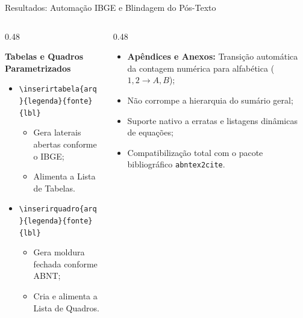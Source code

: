 \documentclass[aspectratio=169, 10pt]{beamer}
\begin{document}
\begin{frame}{Resultados: Automação IBGE e Blindagem do Pós-Texto}
  \begin{columns}[T]
    \begin{column}{0.48\textwidth}
      \begin{block}{\textbf{Tabelas e Quadros Parametrizados}}
        \begin{itemize}
          \item \texttt{\textbackslash inserirtabela\{arq\}\{legenda\}\{fonte\}\{lbl\}}
            \begin{itemize}
              \item Gera laterais abertas conforme o IBGE;
              \item Alimenta a Lista de Tabelas.
            \end{itemize}
          \item \texttt{\textbackslash inserirquadro\{arq\}\{legenda\}\{fonte\}\{lbl\}}
            \begin{itemize}
              \item Gera moldura fechada conforme ABNT;
              \item Cria e alimenta a Lista de Quadros.
            \end{itemize}
        \end{itemize}
      \end{block}
    \end{column}

    \begin{column}{0.48\textwidth}
      \begin{tcolorbox}[colback=white,colframe=conepeteal,title=\textbf{Robustez Pós-Textual}]
        \begin{itemize}
          \item \textbf{Apêndices e Anexos:} Transição automática da contagem numérica para alfabética ($1, 2 \to A, B$);
          \item Não corrompe a hierarquia do sumário geral;
          \item Suporte nativo a erratas e listagens dinâmicas de equações;
          \item Compatibilização total com o pacote bibliográfico \texttt{abntex2cite}.
        \end{itemize}
      \end{tcolorbox}
    \end{column}
  \end{columns}
\end{frame}
\end{document}
